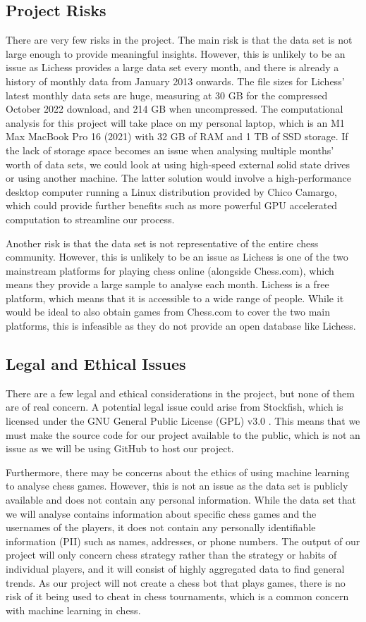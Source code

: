 \documentclass[%
 superscriptaddress,
showpacs,preprintnumbers,
 amsmath,
 amssymb,
 aps,
 pra,
showkeys,
onecolumn,
notitlepage,
11pt,
tightenlines      %
]{revtex4-1}
\begin{document}
\subsection{Project Risks}
There are very few risks in the project. The main risk is that the data set is not large enough to provide meaningful insights. However, this is unlikely to be an issue as Lichess provides a large data set every month, and there is already a history of monthly data from January 2013 onwards. The file sizes for Lichess' latest monthly data sets are huge, measuring at 30 GB for the compressed October 2022 download, and 214 GB when uncompressed. The computational analysis for this project will take place on my personal laptop, which is an M1 Max MacBook Pro 16 (2021) with 32 GB of RAM and 1 TB of SSD storage. If the lack of storage space becomes an issue when analysing multiple months' worth of data sets, we could look at using high-speed external solid state drives or using another machine. The latter solution would involve a high-performance desktop computer running a Linux distribution provided by Chico Camargo, which could provide further benefits such as more powerful GPU accelerated computation to streamline our process.

Another risk is that the data set is not representative of the entire chess community. However, this is unlikely to be an issue as Lichess is one of the two mainstream platforms for playing chess online (alongside Chess.com), which means they provide a large sample to analyse each month. Lichess is a free platform, which means that it is accessible to a wide range of people. While it would be ideal to also obtain games from Chess.com to cover the two main platforms, this is infeasible as they do not provide an open database like Lichess.

\subsection{Legal and Ethical Issues}
There are a few legal and ethical considerations in the project, but none of them are of real concern. A potential legal issue could arise from Stockfish, which is licensed under the GNU General Public License (GPL) v3.0 \cite{stockfishRepository}. This means that we must make the source code for our project available to the public, which is not an issue as we will be using GitHub to host our project.

Furthermore, there may be concerns about the ethics of using machine learning to analyse chess games. However, this is not an issue as the data set is publicly available and does not contain any personal information. While the data set that we will analyse contains information about specific chess games and the usernames of the players, it does not contain any personally identifiable information (PII) such as names, addresses, or phone numbers. The output of our project will only concern chess strategy rather than the strategy or habits of individual players, and it will consist of highly aggregated data to find general trends. As our project will not create a chess bot that plays games, there is no risk of it being used to cheat in chess tournaments, which is a common concern with machine learning in chess.
\end{document}
